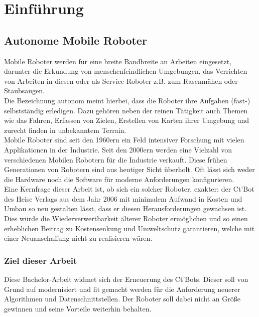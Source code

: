 \documentclass[twoside,12pt,a4paper]{report}
\begin{document}
	\renewcommand{\baselinestretch}{1}
	\small\normalsize
	
	\cleardoublepage
	
	
	
	\setcounter{page}{1}
	
	\chapter{Einführung}
	
	\section{Autonome Mobile Roboter}
	Mobile Roboter werden für eine breite Bandbreite an Arbeiten eingesetzt, darunter die Erkundung von menschenfeindlichen Umgebungen, das Verrichten von Arbeiten in diesen oder als Service-Roboter z.B. zum Rasenmähen oder Staubsaugen.\\
	Die Bezeichnung autonom meint hierbei, dass die Roboter ihre Aufgaben (fast-) selbstständig erledigen. Dazu gehören neben der reinen Tätigkeit auch Themen wie das Fahren, Erfassen von Zielen, Erstellen von Karten ihrer Umgebung und zurecht finden in unbekanntem Terrain. \\
	Mobile Roboter sind seit den 1960ern ein Feld intensiver Forschung mit vielen Applikationen in der Industrie. Seit den 2000ern werden eine Vielzahl von verschiedenen Mobilen Robotern für die Industrie verkauft. Diese frühen Generationen von Robotern sind aus heutiger Sicht überholt. Oft lässt sich weder die Hardware noch die Software für moderne Anforderungen konfigurieren.\\
	Eine Kernfrage dieser Arbeit ist, ob sich ein solcher Roboter, exakter: der Ct'Bot des Heise Verlags aus dem Jahr 2006 mit minimalem Aufwand in Kosten und Umbau so neu gestalten lässt, dass er diesen Herausforderungen gewachsen ist. \\
	Dies würde die Wiederverwertbarkeit älterer Roboter ermöglichen und so einen erheblichen Beitrag zu Kostensenkung und Umweltschutz garantieren, welche mit einer Neuanschaffung nicht zu realisieren wären. 
	
	\subsection{Ziel dieser Arbeit}
	Diese Bachelor-Arbeit widmet sich der Erneuerung des Ct'Bots. Dieser soll von Grund auf modernisiert und fit gemacht werden für die Anforderung neuerer Algorithmen und Datenschnittstellen. Der Roboter soll dabei nicht an Größe gewinnen und seine Vorteile weiterhin behalten. \\
	
\end{document}
